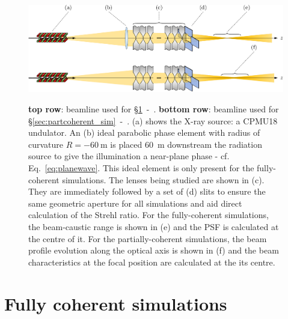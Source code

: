 \begin{refsection}
\begin{figure}[t]
        \centering
        {\includegraphics[width=0.8\linewidth]{figures/ch05/optical_setups.pdf}}
        \caption[Beamlines for coherent- and partially-coherent simulations]{\textbf{top row}: beamline used for  \S\ref{sec:coherent_sim}~-~\textit{}. \textbf{bottom row}: beamline used for  \S\ref{sec:partcoherent_sim}~-~\textit{}. (a) shows the X-ray source: a CPMU18 undulator. An (b) ideal parabolic phase element with radius of curvature $R=-60~$m is placed 60~m downstream the radiation source to give the illumination a near-plane phase - cf. Eq.~\ref{eq:planewave}. This ideal element is only present for the fully-coherent simulations. The lenses being studied are shown in (c). They are immediately followed by a set of (d) slits to ensure the same geometric aperture for all simulations and aid direct calculation of the Strehl ratio. For the fully-coherent simulations, the beam-caustic range is shown in (e) and the PSF is calculated at the centre of it. For the partially-coherent simulations, the beam profile evolution along the optical axis is shown in (f) and the beam characteristics at the focal position are calculated at the its centre. 
        }\label{fig:optical_setups}
\end{figure}

\section{Fully coherent simulations}\label{sec:coherent_sim}


\end{refsection}
